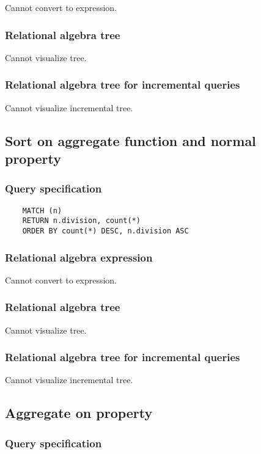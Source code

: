 	Cannot convert to expression.

	\subsubsection*{Relational algebra tree}

	Cannot visualize tree.

	\subsubsection*{Relational algebra tree for incremental queries}

	Cannot visualize incremental tree.
	\subsection{Sort on aggregate function and normal property}

	\subsubsection*{Query specification}

	\begin{lstlisting}
	MATCH (n)
	RETURN n.division, count(*)
	ORDER BY count(*) DESC, n.division ASC
	\end{lstlisting}


	\subsubsection*{Relational algebra expression}

	Cannot convert to expression.

	\subsubsection*{Relational algebra tree}

	Cannot visualize tree.

	\subsubsection*{Relational algebra tree for incremental queries}

	Cannot visualize incremental tree.
	\subsection{Aggregate on property}

	\subsubsection*{Query specification}


